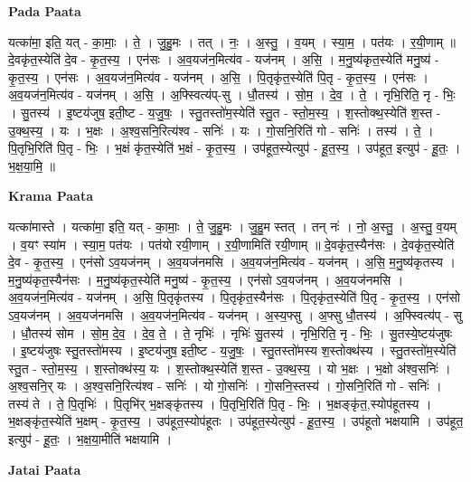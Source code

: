 \documentclass[17pt]{extarticle}
\begin{document}
\textbf{Pada Paata} \newline

यत्का॑मा॒ इति॒ यत् - का॒माः॒ । ते॒ । जु॒हु॒मः । तत् । नः॒ । अ॒स्तु॒ । व॒यम् । स्या॒म॒ । पत॑यः । र॒यी॒णाम् ॥ दे॒वकृ॑त॒स्येति॑ दे॒व - कृ॒त॒स्य॒ । एन॑सः । अ॒व॒यज॑न॒मित्य॑व - यज॑नम् । अ॒सि॒ । म॒नु॒ष्य॑कृत॒स्येति॑ मनु॒ष्य॑ - कृ॒त॒स्य॒ । एन॑सः । अ॒व॒यज॑न॒मित्य॑व - यज॑नम् । अ॒सि॒ । पि॒तृकृ॑त॒स्येति॑ पि॒तृ - कृ॒त॒स्य॒ । एन॑सः । अ॒व॒यज॑न॒मित्य॑व - यज॑नम् । अ॒सि॒ । अ॒फ्स्वित्य॑प्-सु । धौ॒तस्य॑ । सो॒म॒ । दे॒व॒ । ते॒ । नृभि॒रिति॒ नृ - भिः॒ । सु॒तस्य॑ । इ॒ष्टय॑जुष॒ इती॒ष्ट - य॒जु॒षः॒ । स्तु॒तस्तो॑म॒स्येति॑ स्तु॒त - स्तो॒म॒स्य॒ । श॒स्तोक्थ॒स्येति॑ श॒स्त - उ॒क्थ॒स्य॒ । यः । भ॒क्षः । अ॒श्व॒सनि॒रित्य॑श्व - सनिः॑ । यः । गो॒सनि॒रिति॑ गो - सनिः॑ । तस्य॑ । ते॒ । पि॒तृभि॒रिति॑ पि॒तृ - भिः॒ । भ॒क्षं कृ॑त॒स्येति॑ भ॒क्षं - कृ॒त॒स्य॒ । उप॑हूत॒स्येत्युप॑ - हू॒त॒स्य॒ । उप॑हूत॒ इत्युप॑ - हू॒तः॒ । भ॒क्ष॒या॒मि॒ ॥  \newline


\textbf{Krama Paata} \newline

यत्का॑मास्ते । यत्का॑मा॒ इति॒ यत् - का॒माः॒ । ते॒ जु॒हु॒मः । जु॒हु॒म स्तत् । तन् नः॑ । नो॒ अ॒स्तु॒ । अ॒स्तु॒ व॒यम् । व॒यꣳ स्या॑म । स्या॒म॒ पत॑यः । पत॑यो रयी॒णाम् । र॒यी॒णामिति॑ रयी॒णाम् ॥ दे॒वकृ॑त॒स्यैन॑सः । दे॒वकृ॑त॒स्येति॑ दे॒व - कृ॒त॒स्य॒ । एन॑सो ऽव॒यज॑नम् । अ॒व॒यज॑नमसि । अ॒व॒यज॑न॒मित्य॑व - यज॑नम् । अ॒सि॒ म॒नु॒ष्य॑कृतस्य । म॒नु॒ष्य॑कृत॒स्यैन॑सः । म॒नु॒ष्य॑कृत॒स्येति॑ मनु॒ष्य॑ - कृ॒त॒स्य॒ । एन॑सो ऽव॒यज॑नम् । अ॒व॒यज॑नमसि । अ॒व॒यज॑न॒मित्य॑व - यज॑नम् । अ॒सि॒ पि॒तृकृ॑तस्य । पि॒तृकृ॑त॒स्यैन॑सः । पि॒तृकृ॑त॒स्येति॑ पि॒तृ - कृ॒त॒स्य॒ । एन॑सो ऽव॒यज॑नम् । अ॒व॒यज॑नमसि । अ॒व॒यज॑न॒मित्य॑व - यज॑नम् । अ॒स्य॒फ्सु । अ॒फ्सु धौ॒तस्य॑ । अ॒फ्स्वित्य॑प् - सु । धौ॒तस्य॑ सोम । सो॒म॒ दे॒व॒ । दे॒व॒ ते॒ । ते॒ नृभिः॑ । नृभिः॑ सु॒तस्य॑ । नृभि॒रिति॒ नृ - भिः॒ । सु॒तस्ये॒ष्टय॑जुषः । इ॒ष्टय॑जुषः स्तु॒तस्तो॑मस्य । इ॒ष्टय॑जुष॒ इती॒ष्ट - य॒जु॒षः॒ । स्तु॒तस्तो॑मस्य श॒स्तोक्थ॑स्य । स्तु॒तस्तो॑म॒स्येति॑ स्तु॒त - स्तो॒म॒स्य॒ । श॒स्तोक्थ॑स्य॒ यः । श॒स्तोक्थ॒स्येति॑ श॒स्त - उ॒क्थ॒स्य॒ । यो भ॒क्षः । भ॒क्षो अ॑श्व॒सनिः॑ । अ॒श्व॒सनि॒र् यः । अ॒श्व॒सनि॒रित्य॑श्व - सनिः॑ । यो गो॒सनिः॑ । गो॒सनि॒स्तस्य॑ । गो॒सनि॒रिति॑ गो - सनिः॑ । तस्य॑ ते । ते॒ पि॒तृभिः॑ । पि॒तृभि॑र् भ॒क्षङ्कृ॑तस्य । पि॒तृभि॒रिति॑ पि॒तृ - भिः॒ । भ॒क्षङ्कृ॑त॒,स्योप॑हूतस्य । भ॒क्षङ्कृ॑त॒स्येति॑ भ॒क्षम् - कृ॒त॒स्य॒ । उप॑हूत॒स्योप॑हूतः । उप॑हूत॒स्येत्युप॑ - हू॒त॒स्य॒ । उप॑हूतो भक्षयामि । उप॑हूत॒ इत्युप॑ - हू॒तः॒ । भ॒क्ष॒या॒मीति॑ भक्षयामि । \newline

\textbf{Jatai Paata} \newline
\end{document}
